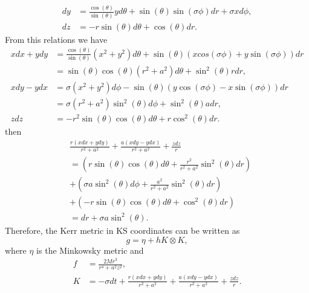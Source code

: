 \begin{Proof}
\begin{align}
  dy&=\frac{\cos{(\theta)}}{\sin{(\theta)}} y d\theta +\sin( \theta) \sin{(\sigma \phi)} dr+\sigma x d\phi,\\
  dz&=-r \sin( \theta) d\theta +\cos( \theta) dr.
\end{align}
From this relations we have
\begin{align}
x dx+ y dy &= \frac{\cos{(\theta)}}{\sin{(\theta)}} (x^2+y^2) d\theta + \sin( \theta) (x cos{(\sigma \phi)} +y \sin{(\sigma \phi)}) dr \nonumber\\
&=\sin( \theta) \cos( \theta) (r^2+a^2) d\theta+\sin^2{(\theta)} r dr, \\
xdy-y dx &= \sigma (x^2+y^2) d\phi-\sin{(\theta)} (y \cos{(\sigma \phi)} - x \sin{(\sigma \phi)}) dr \nonumber\\
&=\sigma (r^2+a^2) \sin^2{(\theta)} d\phi +\sin^2{(\theta)} a dr,\\
z dz &= -r^2 \sin{(\theta)} \cos{(\theta)} d\theta+r \cos^2{(\theta)} dr.
\end{align}
then
\begin{equation}
\begin{aligned}
&\frac{r(x dx+y dy)}{r^2+a^2} + \frac{a(x dy-y dx)}{r^2+a^2}+\frac{z dz}{r}\\
&=(r \sin( \theta) \cos( \theta) d\theta + \frac{r^2}{r^2+a^2} \sin^2{(\theta)} dr)\\
&+(\sigma a \sin^2{(\theta)} d\phi + \frac{a^2}{r^2+a^2} \sin^2{(\theta)} dr)\\
&+(-r \sin{(\theta)} \cos{(\theta)} d\theta+ \cos^2{(\theta)} dr)\\
&=dr+\sigma a \sin^2{(\theta)} .\end{aligned}
\end{equation}
Therefore, the Kerr metric in \gls{KS} coordinates can be written as
\begin{equation}\label{eq:metricinKS}
 g=\eta + h K \otimes K,
\end{equation}
where $\eta$ is the Minkowsky metric and
\begin{align}
 f&=\frac{2 M r^3}{r^4+a^2 z^2}, \nonumber \\
 K&=-\sigma dt + \frac{r(x dx+y dy)}{r^2+a^2} + \frac{a(x dy-y dx)}{r^2+a^2}+\frac{z dz}{r}. \nonumber
\end{align}
\end{Proof}

